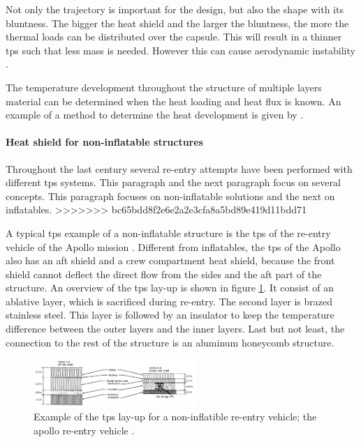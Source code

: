 Not only the trajectory is important for the design, but also the shape with its bluntness. The bigger the heat shield and the larger the bluntness, the more the  thermal loads can be distributed over the capsule. This will result in a thinner \gls{tps} such that less mass is needed. However this can cause aerodynamic instability \cite{Smoot}.

The temperature development throughout the structure of multiple layers material can be determined when the heat loading and heat flux is known. An example of a method to determine the heat development is given by \cite{Daryabeigi2002}.

\paragraph{Heat shield for non-inflatable structures}
Throughout the last century several re-entry attempts have been performed with different \gls{tps} systems. This paragraph and the next paragraph focus on several concepts. This paragraph focuses on non-inflatable solutions and the next on inflatables. 
>>>>>>> bc65bdd8f2e6e2a2e3cfa8a5bd89e419d11bdd71

A typical \gls{tps} example of a non-inflatable structure is the \gls{tps} of the re-entry vehicle of the Apollo mission \cite{Pavlosky1974}. Different from inflatables, the \gls{tps} of the Apollo also has an aft shield and a crew compartment heat shield, because the front shield cannot deflect the direct flow from the sides and the aft part of the structure. An overview of the \gls{tps} lay-up is shown in figure \ref{fig:tpslayupapollo}. It consist of an ablative layer, which is sacrificed during re-entry. The second layer is brazed stainless steel. This layer is followed by an insulator to keep the temperature difference between the outer layers and the inner layers. Last but not least, the connection to the rest of the structure is an aluminum honeycomb structure.

\begin{figure}[H]
\centering
\includegraphics[width = 0.55\textwidth]{Figure/tpsApollo.png}
\caption{Example of the \gls{tps} lay-up for a non-inflatible re-entry vehicle; the apollo re-entry vehicle \cite[p.5]{Pavlosky1974}.}
\label{fig:tpslayupapollo}
\end{figure}


